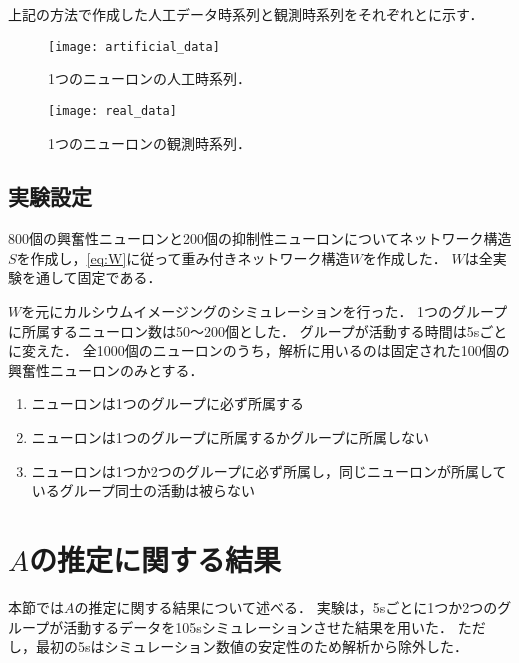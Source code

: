 上記の方法で作成した人工データ時系列と観測時系列をそれぞれとに示す．
\begin{figure}[htbp]
    \begin{minipage}{0.5\hsize}
			\begin{center}
					\texttt{[image: artificial\_data]}
					\caption{1つのニューロンの人工時系列．}
					\label{fig:art}
			\end{center}
		\end{minipage}
    \begin{minipage}{0.5\hsize}
			\begin{center}
					\texttt{[image: real\_data]}
					\caption{1つのニューロンの観測時系列．}
					\label{fig:dat}
			\end{center}
		\end{minipage}
\end{figure}

\subsection{実験設定}
800個の興奮性ニューロンと200個の抑制性ニューロンについてネットワーク構造$S$を作成し，\eqref{eq:W}に従って重み付きネットワーク構造$W$を作成した．
$W$は全実験を通して固定である．

$W$を元にカルシウムイメージングのシミュレーションを行った．
1つのグループに所属するニューロン数は50〜200個とした．
グループが活動する時間は5sごとに変えた．
全1000個のニューロンのうち，解析に用いるのは固定された100個の興奮性ニューロンのみとする．

\begin{enumerate}
  \item ニューロンは1つのグループに必ず所属する
  \item ニューロンは1つのグループに所属するかグループに所属しない
  \item ニューロンは1つか2つのグループに必ず所属し，同じニューロンが所属しているグループ同士の活動は被らない
\end{enumerate}

\section{$A$の推定に関する結果}
本節では$A$の推定に関する結果について述べる．
実験は，5sごとに1つか2つのグループが活動するデータを105sシミュレーションさせた結果を用いた．
ただし，最初の5sはシミュレーション数値の安定性のため解析から除外した．

